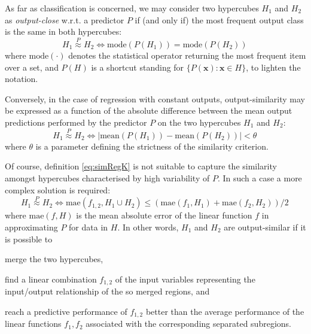 \documentclass[
]{ceurart}
\begin{document}
As far as classification is concerned, we may consider two hypercubes $H_1$ and $H_2$ as \emph{output-close} w.r.t. a predictor $P$ if (and only if) the most frequent output class is the same in both hypercubes:
%
\begin{equation}\label{eq:simClass}
	H_1 \stackrel{P}{\approx} H_2 \Leftrightarrow \text{mode}(P(H_1)) = \text{mode}(P(H_2))\,
\end{equation}
%
where $\text{mode}(\cdot)$ denotes the statistical operator returning the most frequent item over a set, and $P(H)$ is a shortcut standing for $\{ P(\textbf{x}) : \textbf{x} \in H \}$, to lighten the notation.

Conversely, in the case of regression with constant outputs, output-similarity may be expressed as a function of the absolute difference between the mean output predictions performed by the predictor $P$ on the two hypercubes $H_1$ and $H_2$:
%
\begin{equation}\label{eq:simRegK}
	H_1 \stackrel{P}{\approx} H_2 \Leftrightarrow |\text{mean}(P(H_1)) - \text{mean}(P(H_2))| < \theta\,
\end{equation}
%
where $\theta$ is a parameter defining the strictness of the similarity criterion.

Of course, definition \ref{eq:simRegK} is not suitable to capture the similarity amongst hypercubes characterised by high variability of $P$.
%
In such a case a more complex solution is required:
%
\begin{equation}\label{eq:simRegLin}
	H_1 \stackrel{P}{\approx} H_2 \Leftrightarrow \text{mae}(f_{1,2}, H_1 \cup H_2) \leq (\text{mae}(f_1, H_1) + \text{mae}(f_2, H_2)) / 2 \,
\end{equation}
%
where $\text{mae}(f, H)$ is the mean absolute error of the linear function $f$ in approximating 
$P$ for data in $H$.
%
In other words, $H_1$ and $H_2$ are output-similar if it is possible to
%
\begin{inlinelist}
	\item merge the two hypercubes, %
	\item find a linear combination $f_{1,2}$ of the input variables representing the input/output relationship of the so merged regions, and
	\item reach a predictive performance of $f_{1,2}$ better than the average performance of the linear functions $f_1, f_2$ associated with the corresponding separated subregions.
\end{inlinelist}
\end{document}
